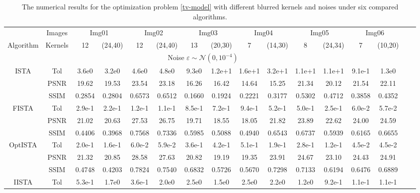 \documentclass{article}
\begin{document}
\begin{table*}[thp]
\begin{center}
	\fontsize{6}{11}\selectfont
	\setlength{\tabcolsep}{1.2mm}
	\caption{The numerical results for the optimization problem \eqref{tv-model} with different blurred kernels and noises under six compared algorithms. 
	} 
\label{real_tv_table}
\begin{tabular}{c|c|c c | cc | cc| cc| cc| cc cc } 
	\hline 
	 & Images & \multicolumn{2}{c|}{Img01} & \multicolumn{2}{c|}{Img02} & \multicolumn{2}{c|}{Img03} &  \multicolumn{2}{c|}{Img04} &\multicolumn{2}{c|}{Img05} &\multicolumn{2}{c}{Img06}\\\cline{2-14}
	Algorithm & Kernels& 12 &(24,40) & 12 & (24,40) & 13 & (20,30)  & 7 & (14,30) & 8  & (24,34) & 7 & (10,20)  \\\hline
    \multicolumn{14}{c}{Noise $\varepsilon\sim \mathcal{N}(0,10^{-4})$} \\\hline
\multirow{3}{*}{ISTA} & Tol & 3.6e0 & 3.2e0 & 4.6e0 & 4.8e0  & 9.3e0 & 1.2e+1 & 1.6e+1 & 3.2e+1 & 1.1e+1 & 1.1e+1 & 9.1e-1 & 1.3e0  \\
	  & PSNR & 19.62 & 19.53 & 23.54 & 23.18  & 16.26 & 16.42 & 14.64 & 15.25 & 21.34 & 20.12 & 21.54 & 22.11 \\ 
      & SSIM & 0.2854 & 0.2804 & 0.6573 & 0.6512  & 0.1660 & 0.1924 & 0.2221 & 0.3177 & 0.5302 & 0.4712 & 0.3858 & 0.4352  \\\hline
\multirow{3}{*}{FISTA} & Tol & 2.9e-1 & 2.2e-1 & 1.2e-1 & 1.1e-1  & 8.5e-1 & 7.2e-1 & 9.4e-1 & 5.2e-1 & 5.0e-1 & 2.5e-1 & 6.0e-2 & 5.7e-2  \\
	  & PSNR & 21.02 & 20.63 & 27.53 & 26.75  & 19.71 & 18.55 & 18.05 & 21.82 & 23.89 & 22.62 & 24.00 & 24.59 \\ 
      & SSIM & 0.4406 & 0.3968 & 0.7568 & 0.7336  & 0.5985 & 0.5088 & 0.4940 & 0.6543 & 0.6737 & 0.5939 & 0.6165 & 0.6655   \\\hline
\multirow{3}{*}{OptISTA} & Tol & 2.0e-1 & 1.6e-1 & 6.0e-2 & 5.9e-2  & 3.6e-1 & 4.2e-1 & 5.1e-1 & 1.9e-1 & 2.8e-1 & 1.2e-1 & 4.5e-2 & 4.5e-2  \\
	  & PSNR & 21.32 & 20.85 & 28.58 & 27.63  & 20.82 & 19.19 & 19.35 & 23.91 & 24.67 & 23.10 & 24.43 & 24.91 \\ 
      & SSIM & 0.4748 & 0.4203 & 0.7824 & 0.7540  & 0.6832 & 0.5726 & 0.5670 & 0.7298 & 0.7133 & 0.6194 & 0.6476 & 0.6889  \\\hline
\multirow{3}{*}{IISTA} & Tol & 5.3e-1 & 1.7e0 & 3.6e-1 & 2.0e0  & 2.5e0 & 1.5e0 & 2.5e0 & 2.2e0 & 1.2e0 & 9.2e-1 & 1.1e-1 & 1.1e-1  \\

\end{tabular}
\end{center}
\end{table*}
\end{document}
